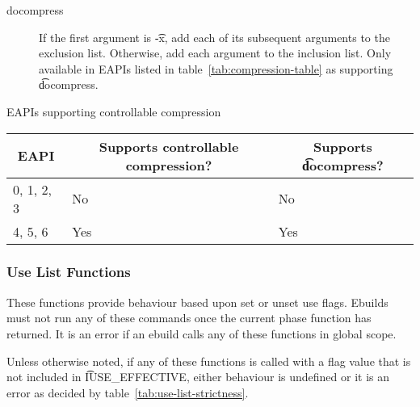 \begin{description}
\item[docompress] If the first argument is \t{-x}, add each of its subsequent arguments to the
exclusion list. Otherwise, add each argument to the inclusion list. Only available in EAPIs listed
in table~\ref{tab:compression-table} as supporting \t{docompress}.
\end{description}

\begin{centertable}{EAPIs supporting controllable compression}
    \label{tab:compression-table}
    \begin{tabular}{lll}
      \toprule
      \multicolumn{1}{c}{\textbf{EAPI}} &
      \multicolumn{1}{c}{\textbf{Supports controllable compression?}} &
      \multicolumn{1}{c}{\textbf{Supports \t{docompress}?}} \\
      \midrule
      0, 1, 2, 3        & No  & No  \\
      4, 5, 6           & Yes & Yes \\
      \bottomrule
    \end{tabular}
\end{centertable}

\subsubsection{Use List Functions}
These functions provide behaviour based upon set or unset use flags. Ebuilds must not run any of
these commands once the current phase function has returned. It is an error if an ebuild calls any
of these functions in global scope.

Unless otherwise noted, if any of these functions is called with a flag value that is not included
in \t{IUSE\_EFFECTIVE}, either behaviour is undefined or it is an error as decided by
table~\ref{tab:use-list-strictness}.

